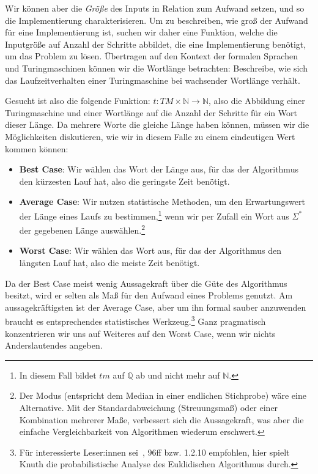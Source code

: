 Wir können aber die \emph{Größe} des Inputs in Relation zum Aufwand setzen,
und so die Implementierung charakterisieren.
Um zu beschreiben,
wie groß der Aufwand für eine Implementierung ist,
suchen wir daher eine Funktion,
welche die Inputgröße auf Anzahl der Schritte abbildet,
die eine Implementierung benötigt,
um das Problem zu lösen.
Übertragen auf den Kontext der formalen Sprachen und Turingmaschinen
können wir die Wortlänge betrachten:
Beschreibe, wie sich das Laufzeitverhalten einer Turingmaschine
bei wachsender Wortlänge verhält.

Gesucht ist also die folgende Funktion:
$t: TM \times \mathbb{N} \rightarrow \mathbb{N}$,
also die Abbildung einer Turingmaschine und einer Wortlänge
auf die Anzahl der Schritte für ein Wort dieser Länge.
Da mehrere Worte die gleiche Länge haben können,
müssen wir die Möglichkeiten diskutieren,
wie wir in diesem Falle zu einem eindeutigen Wert kommen können:
\begin{itemize}
    \item \textbf{Best Case}: Wir wählen das Wort der Länge aus,
        für das der Algorithmus den kürzesten Lauf hat,
        also die geringste Zeit benötigt.
    \item \textbf{Average Case}: Wir nutzen statistische Methoden,
        um den Erwartungswert der Länge eines Laufs zu bestimmen,\footnote{%
            In diesem Fall bildet $tm$ auf $\mathbb{Q}$ ab und nicht mehr auf $\mathbb{N}$.}
        wenn wir per Zufall ein Wort aus $\Sigma^*$ der gegebenen Länge auswählen.\footnote{%
            Der Modus (entspricht dem Median in einer endlichen Stichprobe) wäre eine Alternative.
        Mit der Standardabweichung (Streuungsmaß) oder einer Kombination mehrerer Maße,
        verbessert sich die Aussagekraft,
        was aber die einfache Vergleichbarkeit von Algorithmen wiederum erschwert.}
    \item \textbf{Worst Case}: Wir wählen das Wort aus,
        für das der Algorithmus den längsten Lauf hat,
        also die meiste Zeit benötigt.
\end{itemize}

Da der Best Case meist wenig Aussagekraft über die Güte des Algorithmus besitzt,
wird er selten als Maß für den Aufwand eines Problems genutzt.
Am aussagekräftigsten ist der Average Case,
aber um ihn formal sauber anzuwenden braucht es
entsprechendes statistisches Werkzeug.\footnote{%
    Für interessierte Leser:innen sei~\cite{knuth1}, 96ff bzw. 1.2.10 empfohlen,
    hier spielt Knuth die probabilistische Analyse des Euklidischen Algorithmus durch.}
Ganz pragmatisch konzentrieren wir uns auf Weiteres auf den Worst Case,
wenn wir nichts Anderslautendes angeben.


